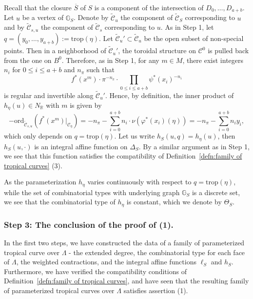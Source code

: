 \documentclass[11pt,reqno]{amsart}
\numberwithin{equation}{section}
\theoremstyle{definition}
\newcommand{\trop}{\mathrm{trop}}
\newcommand{\RR}{{\mathbb R}}
\newcommand{\GG}{{\mathbb G}}
\newcommand{\cC}{{\mathcal{C}}}
\theoremstyle{remark}
\begin{document}
Recall that the closure $\overline S$ of $S$ is a component of the intersection of $D_0,\dotsc,D_{a+b}$.
Let $u$ be a vertex of $\GG_{S}$. %
Denote by
$\widetilde \cC_u$ the component of $\widetilde \cC_S$ corresponding to $u$ and by $\widetilde\cC_{s,u}$ the component of $\widetilde \cC_s$ corresponding to $u$.
As in Step 1, let $q=(y_0,\dotsc,y_{a+b}):=\trop(\eta)$.
Let $\widetilde \cC_u'\subset\widetilde \cC_u$ be the open subset of non-special points. Then in a neighborhood of $\widetilde \cC_u'$, the toroidal structure on $\mathscr C^0$ is pulled back from the one on $B^0$.
Therefore, as in Step 1, for any $m\in M$, there exist integers $n_i$ for $0\leq i\leq a+b$ and $n_\pi$ such that  $$f^*(x^m)\cdot\pi^{-n_\pi}\cdot\prod_{0\leq i\leq a+b} \psi^*(x_i)^{-n_i}$$ is regular and invertible 
along $\widetilde \cC_u'$. 
Hence, by definition, the inner product of $h_\eta(u)\in N_\RR$ with $m$ is given by $$-\mathrm{ord}_{\widetilde \cC_{s,u}}\left(f^*(x^m)|_{\cC_{\overline{\eta}}}\right)=-n_\pi-\sum_{i=0}^{a+b}n_i\cdot \nu\left(\varphi^*(x_i)(\eta)\right)=-n_\pi-\sum_{i=0}^{a+b}n_iy_i,$$ which only depends on $q=\trop(\eta).$
Let us write $h_S(u,q)=h_\eta(u)$, then $h_S(u,\cdot)$ is an integral affine function on $\Delta_S$.
By a similar argument as in Step 1, we see that this function satisfies the compatibility of Definition~\ref{defn:family of tropical curves} (3).

As the parameterization $h_\eta$ varies continuously with respect to $q=\trop(\eta)$, while the set of combinatorial types with underlying graph $\GG_S$ is a discrete set, we see that the combinatorial type of $h_\eta$ is constant, which we denote by $\Theta_S$.

\subsubsection*{Step 3: The conclusion of the proof of (1).}
In the first two steps, we have constructed the data of a family of parameterized tropical curve over $\Lambda$ - the extended degree, the combinatorial type for each face of $\Lambda$, the weighted contractions, and the integral affine functions $\ell_S$ and $h_S$. Furthermore, we have verified the compatibility conditions of Definition~\ref{defn:family of tropical curves}, and have seen that the resulting family of parameterized tropical curves over $\Lambda$ satisfies assertion (1).
\end{document}
